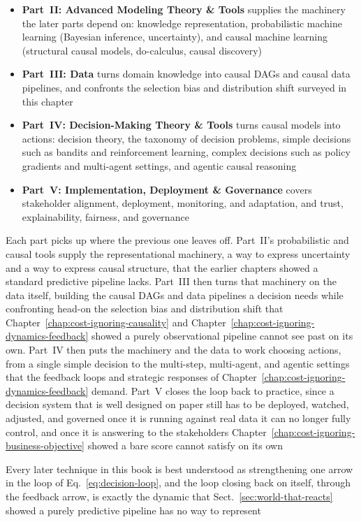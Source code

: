 \begin{itemize}
  \item \textbf{Part~II: Advanced Modeling Theory \& Tools} supplies the
    machinery the later parts depend on: knowledge representation, probabilistic
    machine learning (Bayesian inference, uncertainty), and causal machine
    learning (structural causal models, do-calculus, causal discovery)

  \item \textbf{Part~III: Data} turns domain knowledge into causal DAGs and
    causal data pipelines, and confronts the selection bias and distribution
    shift surveyed in this chapter

  \item \textbf{Part~IV: Decision-Making Theory \& Tools} turns causal models
    into actions: decision theory, the taxonomy of decision problems, simple
    decisions such as bandits and reinforcement learning, complex decisions such
    as policy gradients and multi-agent settings, and agentic causal reasoning

  \item \textbf{Part~V: Implementation, Deployment \& Governance} covers
    stakeholder alignment, deployment, monitoring, and adaptation, and trust,
    explainability, fairness, and governance
\end{itemize}

Each part picks up where the previous one leaves off. Part~II's probabilistic and
causal tools supply the representational machinery, a way to express uncertainty
and a way to express causal structure, that the earlier chapters showed a standard
predictive pipeline lacks. Part~III then turns that machinery on the data itself,
building the causal DAGs and data pipelines a decision needs while confronting
head-on the selection bias and distribution shift that Chapter~\ref{chap:cost-ignoring-causality}
and Chapter~\ref{chap:cost-ignoring-dynamics-feedback} showed a purely observational
pipeline cannot see past on its own. Part~IV then puts the machinery and the data
to work choosing actions, from a single simple decision to the multi-step, multi-agent,
and agentic settings that the feedback loops and strategic responses of
Chapter~\ref{chap:cost-ignoring-dynamics-feedback} demand. Part~V closes the loop
back to practice, since a decision system that is well designed on paper still has
to be deployed, watched, adjusted, and governed once it is running against real
data it can no longer fully control, and once it is answering to the stakeholders
Chapter~\ref{chap:cost-ignoring-business-objective} showed a bare score cannot
satisfy on its own

Every later technique in this book is best understood as strengthening one arrow
in the loop of Eq.~\eqref{eq:decision-loop}, and the loop closing back on itself,
through the feedback arrow, is exactly the dynamic that Sect.~\ref{sec:world-that-reacts}
showed a purely predictive pipeline has no way to represent
